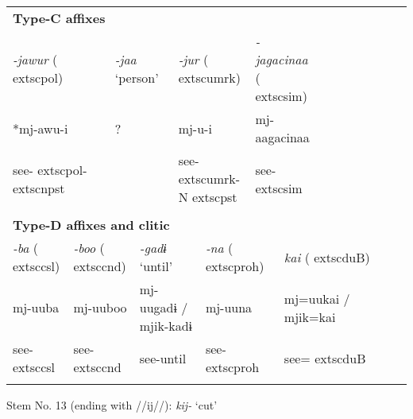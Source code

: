 \begin{tabularx}{\textwidth}{XXXXXXXXXXXXXXXXXXXXXX}
\multicolumn{22}{X}{{\bfseries Type-C affixes}}\\
\multicolumn{4}{X}{{ \textit{{}-jawur} (	extsc{pol})}} & \multicolumn{3}{X}{{ \textit{{}-jaa} ‘person’}} & \multicolumn{4}{X}{{ \textit{{}-jur} (	extsc{umrk})}} & \multicolumn{4}{X}{{ \textit{{}-jagacinaa} (	extsc{sim})}} & \multicolumn{7}{X}{}\\
\multicolumn{4}{X}{{ *mj-awu-i}} & \multicolumn{3}{X}{?} & \multicolumn{4}{X}{mj-u-i} & \multicolumn{4}{X}{{ mj-aagacinaa}} & \multicolumn{7}{X}{}\\
\multicolumn{4}{X}{see-	extsc{pol}-	extsc{npst}} & \multicolumn{3}{X}{} & \multicolumn{4}{X}{see-	extsc{umrk}-N	extsc{pst}} & \multicolumn{4}{X}{see-	extsc{sim}} & \multicolumn{7}{X}{}\\
\multicolumn{22}{X}{}\\
\multicolumn{22}{X}{{\bfseries Type-D affixes and clitic}}\\
{ \textit{{}-ba} (	extsc{csl})} & \multicolumn{4}{X}{{ \textit{{}-boo} (	extsc{cnd})}} & \multicolumn{4}{X}{{ \textit{{}-gadɨ} ‘until’}} & \multicolumn{3}{X}{{ \textit{{}-na} (	extsc{proh})}} & \multicolumn{10}{X}{{ \textit{kai} (	extsc{du}B)}}\\
{ mj-uuba} & \multicolumn{4}{X}{{ mj-uuboo}} & \multicolumn{4}{X}{{ mj-uugadɨ / mjik-kadɨ}} & \multicolumn{3}{X}{{ mj-uuna}} & \multicolumn{10}{X}{{ mj=uukai / mjik=kai}}\\
see-	extsc{csl} & \multicolumn{4}{X}{see-	extsc{cnd}} & \multicolumn{4}{X}{see-until} & \multicolumn{3}{X}{see-	extsc{proh}} & \multicolumn{10}{X}{see=	extsc{du}B}\\
\lspbottomrule
\end{tabularx}
Stem No. 13 (ending with //ij//): \textit{kij-} ‘cut’

\tablefirsthead{}

